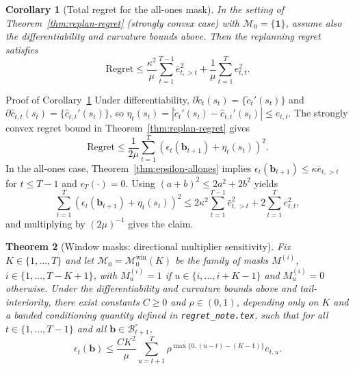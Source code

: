 \documentclass{uai2026} %
\newtheorem{theorem}{Theorem}[section]
\newtheorem{corollary}[theorem]{Corollary}
\newcommand{\1}{\mathbf{1}}
\newcommand{\mcal}{\mathcal{M}}
\begin{document}
\begin{corollary}[Total regret for the all-ones mask]
  \label{cor:regret-allones}
  In the setting of Theorem~\ref{thm:replan-regret} (strongly convex case) with $\mcal_{0}=\{\1\}$, assume also the differentiability and curvature bounds above.
  Then the replanning regret satisfies
  \begin{equation*}
    \mathrm{Regret}
    \le \frac{\kappa^{2}}{\mu}\sum_{t=1}^{T-1} \bar{e}_{t,>t}^{2}
    + \frac{1}{\mu}\sum_{t=1}^{T} e_{t,t}^{2}.
  \end{equation*}
\end{corollary}

\begin{appendixproof}{Proof of Corollary~\ref{cor:regret-allones}}
  Under differentiability, $\partial \tilde{c}_t(s_t)=\{\tilde{c}_t'(s_t)\}$ and $\partial \hat{c}_{t,t}(s_t)=\{\hat{c}_{t,t}'(s_t)\}$, so $\eta_t(s_t)=|\tilde{c}_t'(s_t)-\hat{c}_{t,t}'(s_t)|\le e_{t,t}$.
  The strongly convex regret bound in Theorem~\ref{thm:replan-regret} gives
  \begin{equation*}
    \mathrm{Regret}\le \frac{1}{2\mu}\sum_{t=1}^{T}\left(\epsilon_t(\mathbf{b}_{t+1})+\eta_t(s_t)\right)^2.
  \end{equation*}
  In the all-ones case, Theorem~\ref{thm:epsilon-allones} implies $\epsilon_t(\mathbf{b}_{t+1})\le \kappa \bar{e}_{t,>t}$ for $t\le T-1$ and $\epsilon_T(\cdot)=0$.
  Using $(a+b)^2\le 2a^2+2b^2$ yields
  \begin{equation*}
    \sum_{t=1}^{T}\left(\epsilon_t(\mathbf{b}_{t+1})+\eta_t(s_t)\right)^2
    \le
    2\kappa^2\sum_{t=1}^{T-1}\bar{e}_{t,>t}^2 + 2\sum_{t=1}^{T} e_{t,t}^2,
  \end{equation*}
  and multiplying by $(2\mu)^{-1}$ gives the claim.
\end{appendixproof}

\begin{theorem}[Window masks: directional multiplier sensitivity]
  \label{thm:epsilon-window}
  Fix $K\in\{1,\dots,T\}$ and let $\mcal_{0}=\mcal_{0}^{\mathrm{win}}(K)$ be the family of masks $M^{(i)}$, $i\in\{1,\dots,T-K+1\}$, with $M^{(i)}_u=1$ if $u\in\{i,\dots,i+K-1\}$ and $M^{(i)}_u=0$ otherwise.
  Under the differentiability and curvature bounds above and tail-interiority, there exist constants $C\ge 0$ and $\rho\in(0,1)$, depending only on $K$ and a banded conditioning quantity defined in \texttt{regret\_note.tex}, such that for all $t\in\{1,\dots,T-1\}$ and all $\mathbf{b}\in\mathcal{B}_{t+1}^\circ$,
  \begin{equation*}
    \epsilon_t(\mathbf{b})
    \le
    \frac{C K^{2}}{\mu}\sum_{u=t+1}^{T} \rho^{\max\{0,(u-t)-(K-1)\}} e_{t,u}.
  \end{equation*}
\end{theorem}
\end{document}
